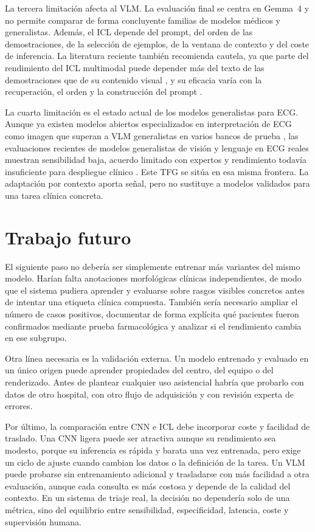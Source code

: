 La tercera limitación afecta al VLM. La evaluación final se centra en Gemma~4 y no permite comparar de forma concluyente familias de modelos médicos y generalistas. Además, el ICL depende del prompt, del orden de las demostraciones, de la selección de ejemplos, de la ventana de contexto y del coste de inferencia. La literatura reciente también recomienda cautela, ya que parte del rendimiento del ICL multimodal puede depender más del texto de las demostraciones que de su contenido visual \cite{chen2024}, y su eficacia varía con la recuperación, el orden y la construcción del prompt \cite{zhang2024mmicl}.

La cuarta limitación es el estado actual de los modelos generalistas para ECG. Aunque ya existen modelos abiertos especializados en interpretación de ECG como imagen que superan a VLM generalistas en varios bancos de prueba \cite{liu2026}, las evaluaciones recientes de modelos generalistas de visión y lenguaje en ECG reales muestran sensibilidad baja, acuerdo limitado con expertos y rendimiento todavía insuficiente para despliegue clínico \cite{soubh2026veecg}. Este TFG se sitúa en esa misma frontera. La adaptación por contexto aporta señal, pero no sustituye a modelos validados para una tarea clínica concreta.

\section{Trabajo futuro}

El siguiente paso no debería ser simplemente entrenar más variantes del mismo modelo. Harían falta anotaciones morfológicas clínicas independientes, de modo que el sistema pudiera aprender y evaluarse sobre rasgos visibles concretos antes de intentar una etiqueta clínica compuesta. También sería necesario ampliar el número de casos positivos, documentar de forma explícita qué pacientes fueron confirmados mediante prueba farmacológica y analizar si el rendimiento cambia en ese subgrupo.

Otra línea necesaria es la validación externa. Un modelo entrenado y evaluado en un único origen puede aprender propiedades del centro, del equipo o del renderizado. Antes de plantear cualquier uso asistencial habría que probarlo con datos de otro hospital, con otro flujo de adquisición y con revisión experta de errores.

Por último, la comparación entre CNN e ICL debe incorporar coste y facilidad de traslado. Una CNN ligera puede ser atractiva aunque su rendimiento sea modesto, porque su inferencia es rápida y barata una vez entrenada, pero exige un ciclo de ajuste cuando cambian los datos o la definición de la tarea. Un VLM puede probarse sin entrenamiento adicional y trasladarse con más facilidad a otra evaluación, aunque cada consulta es más costosa y depende de la calidad del contexto. En un sistema de triaje real, la decisión no dependería solo de una métrica, sino del equilibrio entre sensibilidad, especificidad, latencia, coste y supervisión humana.

